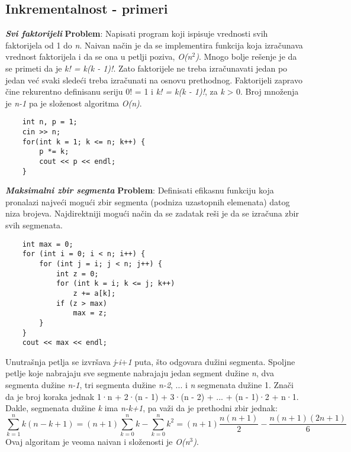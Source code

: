 \documentclass{article}
\begin{document}
\subsection{Inkrementalnost - primeri}
\textit{\textbf{Svi faktorijeli}}
\newline \textbf{Problem}: Napisati program koji ispisuje vrednosti svih faktorijela od 1 do \textit{n}.
\newline Naivan način je da se implementira funkcija koja izračunava vrednost faktorijela
i da se ona u petlji poziva, \textit{O(n$^2$)}.
\newline Mnogo bolje rešenje je da se primeti da je 
\textit{k! = k(k - 1)!}. Zato faktorijele ne
treba izračunavati jedan po jedan već svaki sledeći treba izračunati na osnovu
prethodnog. Faktorijeli zapravo čine rekurentno definisanu seriju 0! = 1 i 
\textit{k! = k(k - 1)!}, za \textit{k} > 0. Broj množenja je \textit{n-1} pa je složenost algoritma \textit{O(n)}.
\begin{lstlisting}
    int n, p = 1;
    cin >> n;
    for(int k = 1; k <= n; k++) {
        p *= k;
        cout << p << endl;
    }
\end{lstlisting}
\textit{\textbf{Maksimalni zbir segmenta}}
\newline \textbf{Problem}: Definisati efikasnu funkciju koja pronalazi najveći mogući zbir segmenta (podniza uzastopnih elemenata) datog niza brojeva.
\newline Najdirektniji mogući način da se zadatak reši je da se izračuna zbir svih segmenata.
\begin{lstlisting}
    int max = 0;
    for (int i = 0; i < n; i++) {
        for (int j = i; j < n; j++) {
            int z = 0;
            for (int k = i; k <= j; k++)
                z += a[k];
            if (z > max)
                max = z;
        }
    }
    cout << max << endl;
\end{lstlisting}
Unutrašnja petlja se izvršava \textit{j}-\textit{i}+\textit{1} puta, što odgovara dužini segmenta. Spoljne petlje koje
nabrajaju sve segmente nabrajaju jedan segment dužine \textit{n}, dva segmenta dužine
\textit{n-1}, tri segmenta dužine \textit{n-2}, ... i \textit{n} segmenata dužine 1. Znači da je broj
koraka jednak 1·n + 2·(n - 1) + 3·(n - 2) + ... + (n - 1)·2 + n·1. Dakle,
segmenata dužine \textit{k} ima \textit{n-k+1}, pa važi da je prethodni zbir jednak:
$$ \sum_{k=1}^n k(n-k+1) = (n+1)\sum_{k=0}^n k - \sum_{k=0}^n k^2 = (n+1)\frac{n(n+1)}{2} - \frac{n(n+1)(2n+1)}{6} $$
Ovaj algoritam je veoma naivan i složenosti
je \textit{O(n$^3$)}.
\end{document}
